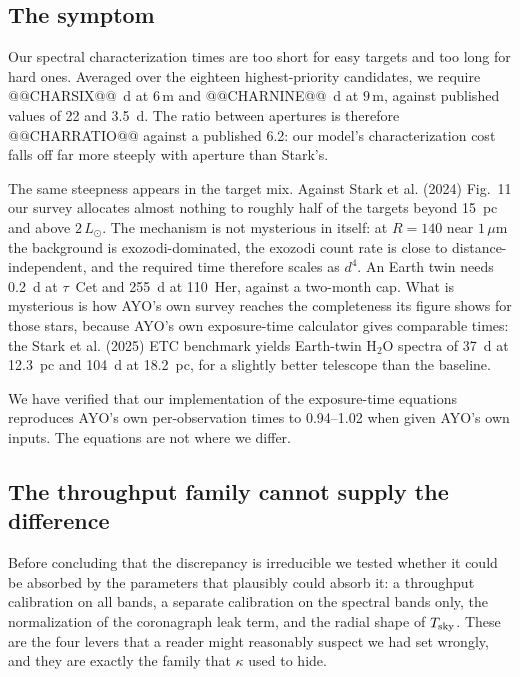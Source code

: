 \documentclass[11pt,a4paper]{article}
\begin{document}
\subsection{The symptom}

Our spectral characterization times are too short for easy targets and too long for hard ones.
Averaged over the eighteen highest-priority candidates, we require @@CHARSIX@@~d at $6\,$m and
@@CHARNINE@@~d at $9\,$m, against published values of 22 and 3.5~d. The ratio between apertures
is therefore @@CHARRATIO@@ against a published 6.2: our model's characterization cost falls off
far more steeply with aperture than Stark's.

The same steepness appears in the target mix. Against Stark et al. (2024) Fig.~11 our survey
allocates almost nothing to roughly half of the targets beyond 15~pc and above $2\,L_\odot$. The
mechanism is not mysterious in itself: at $R = 140$ near $1\,\mu$m the background is
exozodi-dominated, the exozodi count rate is close to distance-independent, and the required time
therefore scales as $d^4$. An Earth twin needs 0.2~d at $\tau$~Cet and 255~d at 110~Her, against a
two-month cap. What is mysterious is how AYO's own survey reaches the completeness its figure
shows for those stars, because AYO's own exposure-time calculator gives comparable times: the
Stark et al. (2025) ETC benchmark yields Earth-twin H$_2$O spectra of 37~d at 12.3~pc and 104~d at
18.2~pc, for a slightly better telescope than the baseline.

We have verified that our implementation of the exposure-time equations reproduces AYO's own
per-observation times to 0.94--1.02 when given AYO's own inputs. The equations are not where we
differ.

\subsection{The throughput family cannot supply the difference}

Before concluding that the discrepancy is irreducible we tested whether it could be absorbed by
the parameters that plausibly could absorb it: a throughput calibration on all bands, a separate
calibration on the spectral bands only, the normalization of the coronagraph leak term, and the
radial shape of $T_{\rm sky}$. These are the four levers that a reader might reasonably suspect
we had set wrongly, and they are exactly the family that $\kappa$ used to hide.
\end{document}
